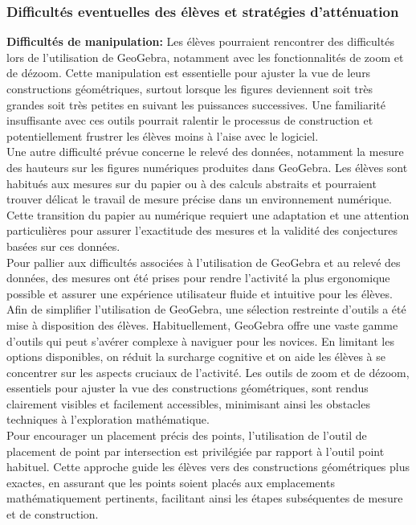 \subsubsection{Difficultés eventuelles des élèves et stratégies d'atténuation}

\textbf{Difficultés de manipulation:}
Les élèves pourraient rencontrer des difficultés lors de l'utilisation de GeoGebra,
notamment avec les fonctionnalités de zoom et de dézoom.
Cette manipulation est essentielle pour ajuster la vue de leurs constructions géométriques,
surtout lorsque les figures deviennent soit très grandes soit très petites en suivant les puissances successives.
Une familiarité insuffisante avec ces outils pourrait ralentir le processus de construction et potentiellement frustrer les élèves moins à l'aise avec le logiciel.\\

Une autre difficulté prévue concerne le relevé des données,
notamment la mesure des hauteurs sur les figures numériques produites dans GeoGebra.
Les élèves sont habitués aux mesures sur du papier ou à des calculs abstraits et pourraient trouver délicat le travail de mesure précise dans un environnement numérique.
Cette transition du papier au numérique requiert une adaptation et une attention particulières pour assurer l'exactitude des mesures et la validité des conjectures basées sur ces données.\\

Pour pallier aux difficultés associées à l'utilisation de GeoGebra et au relevé des données,
des mesures ont été prises pour rendre l'activité la plus ergonomique possible et assurer une expérience utilisateur fluide et intuitive pour les élèves.\\

Afin de simplifier l'utilisation de GeoGebra,
une sélection restreinte d'outils a été mise à disposition des élèves.
Habituellement,
GeoGebra offre une vaste gamme d'outils qui peut s'avérer complexe à naviguer pour les novices.
En limitant les options disponibles,
on réduit la surcharge cognitive et on aide les élèves à se concentrer sur les aspects cruciaux de l'activité.
Les outils de zoom et de dézoom,
essentiels pour ajuster la vue des constructions géométriques,
sont rendus clairement visibles et facilement accessibles,
minimisant ainsi les obstacles techniques à l'exploration mathématique.\\

Pour encourager un placement précis des points,
l'utilisation de l'outil de placement de point par intersection est privilégiée par rapport à l'outil point habituel.
Cette approche guide les élèves vers des constructions géométriques plus exactes,
en assurant que les points soient placés aux emplacements mathématiquement pertinents,
facilitant ainsi les étapes subséquentes de mesure et de construction.\\

